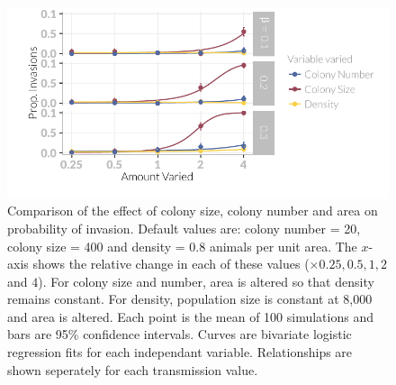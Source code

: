 \begin{knitrout}\footnotesize
{}\color{fgcolor}\begin{figure}[t]

{\centering \includegraphics[width=\textwidth]{figure/plotValueChangeMeans-1} 

}

\caption[Comparison of the probability of invasion when population size is altered by changing colony size or colony number.]{
Comparison of the effect of colony size, colony number and area on probability of invasion.
Default values are: colony number = 20, colony size = 400 and density = 0.8 animals per unit area.
The $x$-axis shows the relative change in each of these values ($\times 0.25, 0.5, 1, 2$ and $4$).
For colony size and number, area is altered so that density remains constant.
For density, population size is constant at 8,000 and area is altered.
Each point is the mean of 100 simulations and bars are 95\% confidence intervals.
Curves are bivariate logistic regression fits for each independant variable.
Relationships are shown seperately for each transmission value.
}\label{fig:plotValueChangeMeans}
\end{figure}


\end{knitrout}







